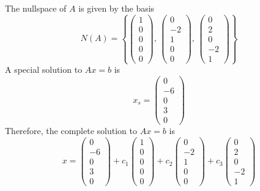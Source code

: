 \documentclass{article}
\begin{document}
\bigbreak

The nullspace of $ A $ is given by the basis
$$ N(A) = \left\{ \begin{pmatrix}
    1 \\
    0 \\
    0 \\
    0 \\
    0
\end{pmatrix},\, \begin{pmatrix}
    0 \\
    -2 \\
    1 \\
    0 \\
    0
\end{pmatrix},\, \begin{pmatrix}
    0 \\
    2 \\
    0 \\
    -2 \\
    1
\end{pmatrix} \right\} $$
A special solution to $ Ax = b $ is
$$ x_s = \begin{pmatrix}
    0 \\
    -6 \\
    0 \\
    3 \\
    0
\end{pmatrix} $$
Therefore, the complete solution to $ Ax = b $ is
$$ x = \begin{pmatrix}
    0 \\
    -6 \\
    0 \\
    3 \\
    0
\end{pmatrix} + c_1 \begin{pmatrix}
    1 \\
    0 \\
    0 \\
    0 \\
    0
\end{pmatrix} + c_2 \begin{pmatrix}
    0 \\
    -2 \\
    1 \\
    0 \\
    0
\end{pmatrix} + c_3 \begin{pmatrix}
    0 \\
    2 \\
    0 \\
    -2 \\
    1
\end{pmatrix} $$
\end{document}
